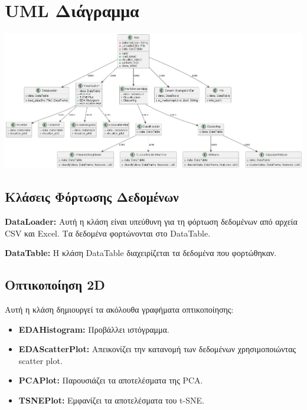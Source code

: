 \documentclass{article}
\begin{document}
\section{UML Διάγραμμα}

\includegraphics[width=1.25\textwidth]{photos/uml_datagram.png}

\subsection{Κλάσεις Φόρτωσης Δεδομένων}

\textbf{DataLoader:} Αυτή η κλάση είναι υπεύθυνη για τη φόρτωση δεδομένων από αρχεία CSV και Excel. Τα δεδομένα φορτώνονται στο DataTable.

\textbf{DataTable:} Η κλάση DataTable διαχειρίζεται τα δεδομένα που φορτώθηκαν.

\subsection{Οπτικοποίηση 2D}

Αυτή η κλάση δημιουργεί τα ακόλουθα γραφήματα οπτικοποίησης:

\begin{itemize}
  \item \textbf{EDAHistogram:} Προβάλλει ιστόγραμμα.
  \item \textbf{EDAScatterPlot:} Απεικονίζει την κατανομή των δεδομένων χρησιμοποιώντας scatter plot.
  \item \textbf{PCAPlot:} Παρουσιάζει τα αποτελέσματα της PCA. 
  \item \textbf{TSNEPlot:} Εμφανίζει τα αποτελέσματα του t-SNE.
\end{itemize}
\end{document}
